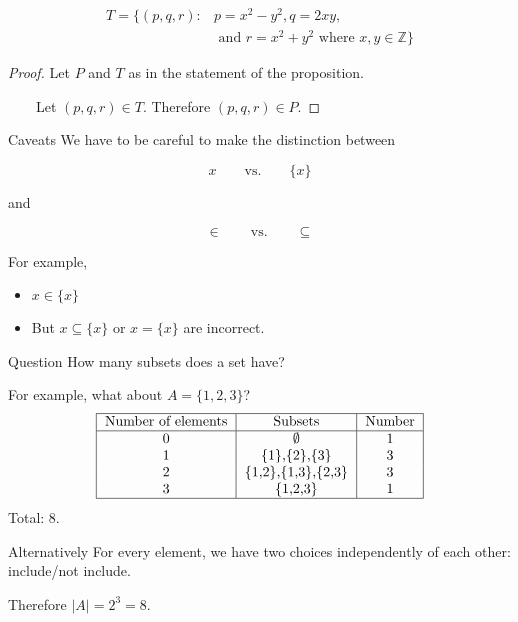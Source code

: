 \documentclass{beamer}
\def\bl[#1]#2{\begin{block}{#1}#2\end{block}}
\def\itemb{\begin{itemize}}
\def\iteme{\end{itemize}}
\begin{document}
\begin{frame}
\bl[]{
\vspace{-0.3cm}
\begin{align*}
T=\{(p,q,r): &p=x^2-y^2, q=2xy,\\
&\textrm{ and } r=x^2+y^2\textrm{ where } x,y\in\mathbb{Z}\}
\end{align*}}
\begin{proof}
Let $P$ and $T$ as in the statement of the proposition.

~~~~Let $(p,q,r)\in T$.
 \color{black}Therefore $(p,q,r)\in P$.
\end{proof}
\end{frame}

\begin{frame}{Caveats}
We have to be careful to make the distinction between
\bl[]{
\[
x \qquad\textrm{vs.}\qquad \{x\}
\]}\pause
and
\bl[]{
\[
\in\qquad\textrm{vs.}\qquad \subseteq
\]}\pause
For example,
\itemb
\item  $x\in\{x\}$
\item But $x\subseteq\{x\}$ or $x=\{x\}$ are incorrect.
\iteme
\end{frame}

\begin{frame}
\bl[Question]{
How many subsets does a set have?}\pause

For example, what about $A=\{1,2,3\}$?
\[
\begin{tabular}{|c|c|c|}
\hline
Number of elements&Subsets&Number\\
\hline
0&$\emptyset$&1\\
1&\{1\},\{2\},\{3\}&3\\
2&\{1,2\},\{1,3\},\{2,3\}&3\\
3&\{1,2,3\}&1\\
\hline
\end{tabular}
\]
Total: $8$.\pause
\bl[Alternatively]{
For every element, we have two choices independently of each other: include/not include.
}
Therefore $|A|=2^3=8$.
\end{frame}
\end{document}
